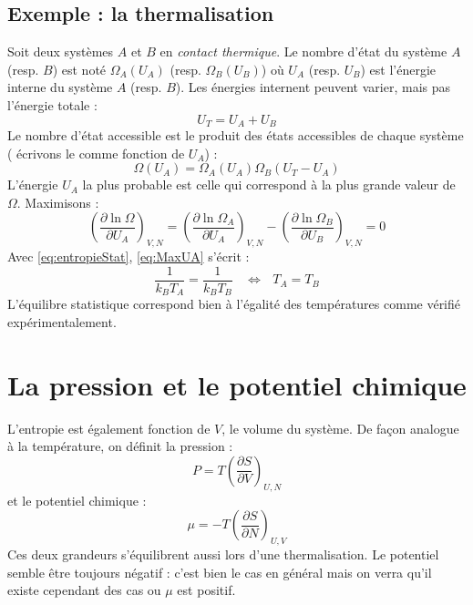 \documentclass[british,french,11pt, a4paper, openany]{book}
\begin{document}
\subsection*{Exemple : la thermalisation}
Soit deux systèmes $A$ et $B$ en \textit{contact thermique}. Le nombre d'état du système
$A$ (resp. $B$) est noté $\Omega_A(U_A)$ (resp. $\Omega_B(U_B)$) où $U_A$ (resp. $U_B$) est 
l'énergie interne du système $A$ (resp. $B$). Les énergies internent peuvent varier, mais 
pas l'énergie totale :
\begin{equation}
	U_T = U_A+U_B
\end{equation}
Le nombre d'état accessible est le produit des états accessibles de chaque système (
écrivons le comme fonction de $U_A$) :
\begin{equation}
	\Omega(U_A) = \Omega_A(U_A)\Omega_B(U_T-U_A)
\end{equation}
L'énergie $U_A$ la plus probable est celle qui correspond à la plus grande valeur de $
\Omega$. Maximisons :
\begin{equation}
	\left(\dfrac{\partial \ln\Omega}{\partial U_A}\right)_{V,N} =	\left(\dfrac{\partial \ln\Omega_A}
	{\partial U_A}\right)_{V,N} - 	\left(\dfrac{\partial \ln\Omega_B}{\partial U_B}\right)_{V,N} = 0
	\label{eq:MaxUA}
\end{equation}
Avec \autoref{eq:entropieStat}, \autoref{eq:MaxUA} s'écrit :
\begin{equation}
	\frac{1}{k_BT_A} = \frac{1}{k_BT_B}\ \ \ \ \Leftrightarrow\ \ \ T_A = T_B
\end{equation}
L'équilibre statistique correspond bien à l'égalité des températures comme vérifié
expérimentalement.


\section{La pression et le potentiel chimique}
L'entropie est également fonction de $V$, le volume du système. De façon analogue à la 
température, on définit la pression :
\begin{equation}
	P = T\left(\dfrac{\partial S}{\partial V}\right)_{U,N}
\end{equation}
et le potentiel chimique :
\begin{equation}
	\mu = -T\left(\dfrac{\partial S}{\partial N}\right)_{U,V}
\end{equation}
Ces deux grandeurs s'équilibrent aussi lors d'une thermalisation. Le potentiel semble être 
toujours négatif : c'est bien le cas en général mais on verra qu'il existe cependant des 
cas ou $\mu$ est positif.
\end{document}
